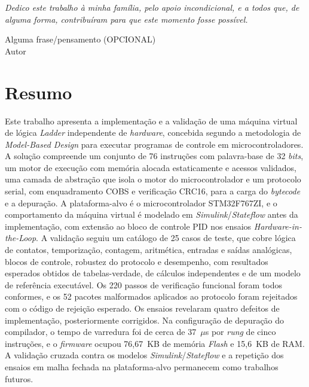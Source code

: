 \documentclass[portuguese,12pt,oneside,a4paper]{book}
\begin{document}
        \begin{flushright}
			\textit{Dedico este trabalho à minha família, pelo apoio incondicional, e a todos que, de alguma forma, contribuíram para que este momento fosse possível.}
        \end{flushright}



\pagebreak

\newpage
\thispagestyle{empty}


        \vspace*{20.0cm}

        \begin{flushright}

             Alguma frase/pensamento (OPCIONAL)\\
             Autor\\


        \end{flushright}



\pagebreak



\chapter*{Resumo}
	Este trabalho apresenta a implementação e a validação de uma máquina virtual de lógica \textit{Ladder} independente de \textit{hardware}, concebida segundo a metodologia de \textit{Model-Based Design} para executar programas de controle em microcontroladores. A solução compreende um conjunto de 76 instruções com palavra-base de 32 \textit{bits}, um motor de execução com memória alocada estaticamente e acessos validados, uma camada de abstração que isola o motor do microcontrolador e um protocolo serial, com enquadramento COBS e verificação CRC16, para a carga do \textit{bytecode} e a depuração. A plataforma-alvo é o microcontrolador STM32F767ZI, e o comportamento da máquina virtual é modelado em \textit{Simulink}/\textit{Stateflow} antes da implementação, com extensão ao bloco de controle PID nos ensaios \textit{Hardware-in-the-Loop}. A validação seguiu um catálogo de 25 casos de teste, que cobre lógica de contatos, temporização, contagem, aritmética, entradas e saídas analógicas, blocos de controle, robustez do protocolo e desempenho, com resultados esperados obtidos de tabelas-verdade, de cálculos independentes e de um modelo de referência executável. Os 220 passos de verificação funcional foram todos conformes, e os 52 pacotes malformados aplicados ao protocolo foram rejeitados com o código de rejeição esperado. Os ensaios revelaram quatro defeitos de implementação, posteriormente corrigidos. Na configuração de depuração do compilador, o tempo de varredura foi de cerca de 37~$\mu$s por \textit{rung} de cinco instruções, e o \textit{firmware} ocupou 76,67~KB de memória \textit{Flash} e 15,6~KB de RAM. A validação cruzada contra os modelos \textit{Simulink}/\textit{Stateflow} e a repetição dos ensaios em malha fechada na plataforma-alvo permanecem como trabalhos futuros.\\
\end{document}
